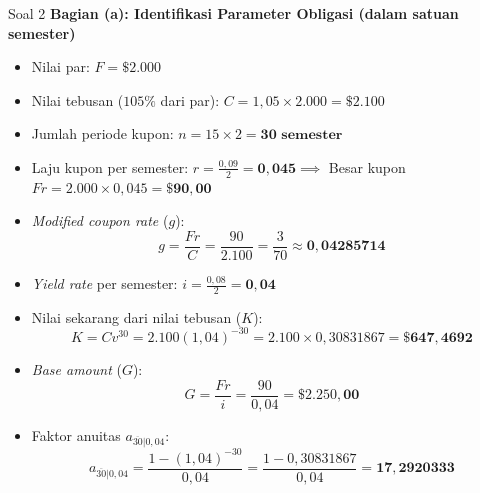 \documentclass[11pt,a4paper]{article}
\begin{document}
\begin{solutionbox}{Soal 2}
\textbf{Bagian (a): Identifikasi Parameter Obligasi (dalam satuan semester)}
\begin{itemize}[itemsep=2pt]
    \item Nilai par: $F = \mathbf{\$2.000}$
    \item Nilai tebusan ($105\%$ dari par): $C = 1{,}05 \times 2.000 = \mathbf{\$2.100}$
    \item Jumlah periode kupon: $n = 15 \times 2 = \mathbf{30 \text{ semester}}$
    \item Laju kupon per semester: $r = \frac{0{,}09}{2} = \mathbf{0{,}045} \implies$ Besar kupon $Fr = 2.000 \times 0{,}045 = \mathbf{\$90{,}00}$
    \item \textit{Modified coupon rate} ($g$):
    \begin{equation*}
        g = \frac{Fr}{C} = \frac{90}{2.100} = \frac{3}{70} \approx \mathbf{0{,}04285714}
    \end{equation*}
    \item \textit{Yield rate} per semester: $i = \frac{0{,}08}{2} = \mathbf{0{,}04}$
    \item Nilai sekarang dari nilai tebusan ($K$):
    \begin{equation*}
        K = C v^{30} = 2.100(1{,}04)^{-30} = 2.100 \times 0{,}30831867 = \mathbf{\$647{,}4692}
    \end{equation*}
    \item \textit{Base amount} ($G$):
    \begin{equation*}
        G = \frac{Fr}{i} = \frac{90}{0{,}04} = \mathbf{\$2.250{,}00}
    \end{equation*}
    \item Faktor anuitas $a_{\overline{30}|0{,}04}$:
    \begin{equation*}
        a_{\overline{30}|0{,}04} = \frac{1 - (1{,}04)^{-30}}{0{,}04} = \frac{1 - 0{,}30831867}{0{,}04} = \mathbf{17{,}2920333}
    \end{equation*}
\end{itemize}


\end{solutionbox}
\end{document}
